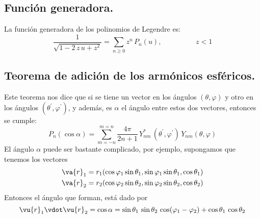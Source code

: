 \subsection*{Función generadora.}
La función generadora de los polinomios de Legendre es:
\[ \dfrac{1}{\sqrt{1 - 2 \, z \, u + z^{2}}} = \sum_{n \geq 0} z^{n} \, P_{n} (u), \hspace{2cm} z < 1 \]
\subsection{Teorema de adición de los armónicos esféricos.}
Este teorema nos dice que si se tiene un vector en los ángulos $(\theta, \varphi)$ y otro en los ángulos $(\theta^{\prime}, \varphi^{\prime})$, y además, es $\alpha$ el ángulo entre estos dos vectores, entonces se cumple:
\[ P_{n} (\cos \alpha) = \sum_{m=-n}^{m=n} \dfrac{4 \pi}{2 n + 1} \, Y_{nm}^{*} \, (\theta^{\prime}, \varphi^{\prime}) \, Y_{nm} (\theta, \varphi) \]
El ángulo $\alpha$ puede ser bastante complicado, por ejemplo, supongamos que tenemos los vectores
\begin{align*}
\va{r}_{1} =  r_{1} (\cos \varphi_{1} \sin \theta_{1}, \sin \varphi_{1} \sin \theta_{1}, \cos \theta_{1}) \\
\va{r}_{2} =  r_{2} (\cos \varphi_{2} \sin \theta_{2}, \sin \varphi_{2} \sin \theta_{2}, \cos \theta_{2})
\end{align*}
Entonces el ángulo que forman, está dado por
\[ \vu{r}_{1} \vdot \vu{r}_{2} = \cos \alpha = \sin \theta_{1} \, \sin \theta_{2} \, \cos (\varphi_{1} - \varphi_{2}) + \cos \theta_{1} \, \cos \theta_{2} \]
